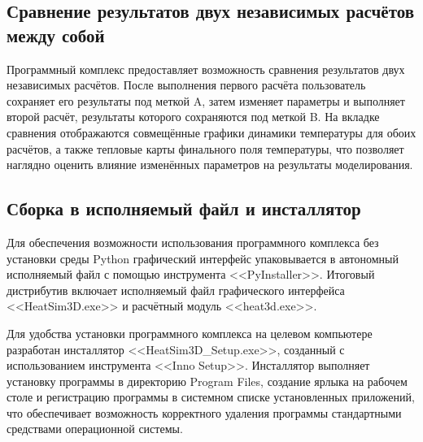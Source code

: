 \subsection{Сравнение результатов двух независимых расчётов между собой}

Программный комплекс предоставляет возможность сравнения 
результатов двух независимых расчётов. После выполнения 
первого расчёта пользователь сохраняет его результаты 
под меткой A, затем изменяет параметры и выполняет второй 
расчёт, результаты которого сохраняются под меткой B. 
На вкладке сравнения отображаются совмещённые графики 
динамики температуры для обоих расчётов, а также тепловые 
карты финального поля температуры, что позволяет наглядно 
оценить влияние изменённых параметров на результаты 
моделирования.

\subsection{Сборка в исполняемый файл и инсталлятор}


Для обеспечения возможности использования программного 
комплекса без установки среды Python графический интерфейс 
упаковывается в автономный исполняемый файл с помощью 
инструмента <<PyInstaller>>. Итоговый дистрибутив включает 
исполняемый файл графического интерфейса <<HeatSim3D.exe>> 
и расчётный модуль <<heat3d.exe>>.

Для удобства установки программного комплекса на целевом 
компьютере разработан инсталлятор <<HeatSim3D\_Setup.exe>>, 
созданный с использованием инструмента <<Inno Setup>>. 
Инсталлятор выполняет установку программы в директорию 
Program Files, создание ярлыка на рабочем столе и 
регистрацию программы в системном списке установленных 
приложений, что обеспечивает возможность корректного 
удаления программы стандартными средствами операционной 
системы.
